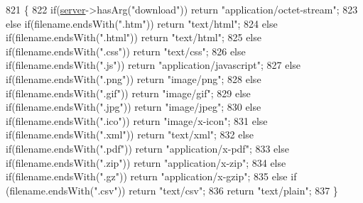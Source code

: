 \begin{DoxyCode}
821                                                  \{
822   \textcolor{keywordflow}{if}(\hyperlink{class_wi_fi_manager_a509523a01c0395cf0dc235b074f2a5ea}{server}->hasArg(\textcolor{stringliteral}{"download"})) \textcolor{keywordflow}{return} \textcolor{stringliteral}{"application/octet-stream"};
823   \textcolor{keywordflow}{else} \textcolor{keywordflow}{if}(filename.endsWith(\textcolor{stringliteral}{".htm"})) \textcolor{keywordflow}{return} \textcolor{stringliteral}{"text/html"};
824   \textcolor{keywordflow}{else} \textcolor{keywordflow}{if}(filename.endsWith(\textcolor{stringliteral}{".html"})) \textcolor{keywordflow}{return} \textcolor{stringliteral}{"text/html"};
825   \textcolor{keywordflow}{else} \textcolor{keywordflow}{if}(filename.endsWith(\textcolor{stringliteral}{".css"})) \textcolor{keywordflow}{return} \textcolor{stringliteral}{"text/css"};
826   \textcolor{keywordflow}{else} \textcolor{keywordflow}{if}(filename.endsWith(\textcolor{stringliteral}{".js"})) \textcolor{keywordflow}{return} \textcolor{stringliteral}{"application/javascript"};
827   \textcolor{keywordflow}{else} \textcolor{keywordflow}{if}(filename.endsWith(\textcolor{stringliteral}{".png"})) \textcolor{keywordflow}{return} \textcolor{stringliteral}{"image/png"};
828   \textcolor{keywordflow}{else} \textcolor{keywordflow}{if}(filename.endsWith(\textcolor{stringliteral}{".gif"})) \textcolor{keywordflow}{return} \textcolor{stringliteral}{"image/gif"};
829   \textcolor{keywordflow}{else} \textcolor{keywordflow}{if}(filename.endsWith(\textcolor{stringliteral}{".jpg"})) \textcolor{keywordflow}{return} \textcolor{stringliteral}{"image/jpeg"};
830   \textcolor{keywordflow}{else} \textcolor{keywordflow}{if}(filename.endsWith(\textcolor{stringliteral}{".ico"})) \textcolor{keywordflow}{return} \textcolor{stringliteral}{"image/x-icon"};
831   \textcolor{keywordflow}{else} \textcolor{keywordflow}{if}(filename.endsWith(\textcolor{stringliteral}{".xml"})) \textcolor{keywordflow}{return} \textcolor{stringliteral}{"text/xml"};
832   \textcolor{keywordflow}{else} \textcolor{keywordflow}{if}(filename.endsWith(\textcolor{stringliteral}{".pdf"})) \textcolor{keywordflow}{return} \textcolor{stringliteral}{"application/x-pdf"};
833   \textcolor{keywordflow}{else} \textcolor{keywordflow}{if}(filename.endsWith(\textcolor{stringliteral}{".zip"})) \textcolor{keywordflow}{return} \textcolor{stringliteral}{"application/x-zip"};
834   \textcolor{keywordflow}{else} \textcolor{keywordflow}{if}(filename.endsWith(\textcolor{stringliteral}{".gz"})) \textcolor{keywordflow}{return} \textcolor{stringliteral}{"application/x-gzip"};
835   \textcolor{keywordflow}{else} \textcolor{keywordflow}{if} (filename.endsWith(\textcolor{stringliteral}{".csv"})) \textcolor{keywordflow}{return} \textcolor{stringliteral}{"text/csv"};
836   \textcolor{keywordflow}{return} \textcolor{stringliteral}{"text/plain"};
837 \}
\end{DoxyCode}
